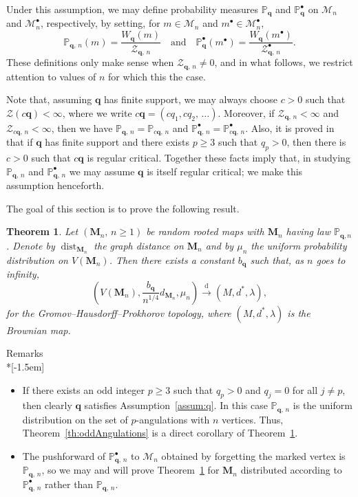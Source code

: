 \documentclass[10pt]{amsart}
\newtheorem{theo}{Theorem}[section]
\theoremstyle{definition}\newtheorem{defi}[theo]{Definition}\newtheorem{rema}[theo]{Remark}\newtheorem{exam}[theo]{Example}\newtheorem{exem}[theo]{Example}\newtheorem{nota}[theo]{Notation}
\newcommand{\bbP}{\mathbb{P}}
\newcommand{\bfq}{\mathbf{q}}
\newcommand{\cM}{\mathcal{M}}
\newcommand{\cZ}{\mathcal{Z}}
\newcommand{\bM}{\mathbf{M}}
\DeclareMathOperator{\dist}{dist}
\newcommand{\sbt}{{\ensuremath{\scriptscriptstyle\bullet}}}
\newcommand{\convdist}{\ensuremath{\stackrel{\mathrm{d}}{\rightarrow}}}
\begin{document}
Under this assumption, we may define probability measures $\bbP_{\bfq}$ and $\bbP^\bullet_{\bfq}$ on $\cM_n$ and $\cM_n^\bullet$, respectively, by setting, for $m\in \cM_n$ and $m^\sbt \in \cM_n^\sbt$,
\[
\bbP_{\bfq,\,n}(m) = \frac{W_{\bfq}(m)}{\cZ_{\bfq,\,n}}\quad \text{and}\quad\bbP^\bullet_{\bfq}(m^\sbt) = \frac{W_{\bfq}(m^\sbt)}{\cZ^\sbt_{\bfq,\,n}}.
\]
These definitions only make sense when $\cZ_{\bfq,\,n}\neq 0$, and in what follows, we restrict attention to values of $n$ for which this the case.


Note that, assuming $\bfq$ has finite support, we may always choose $c > 0$ such that $\cZ(c\bfq)<\infty$, where we write $c\bfq=(cq_1,cq_2,\,\ldots)$. Moreover, if $\cZ_{\bfq,\,n}< \infty$ and $\cZ_{c\bfq,\,n}<\infty$, then we have $\bbP_{\bfq,\,n}=\bbP_{c\bfq,\,n}$ and $\bbP_{\bfq,\,n}^\sbt=\bbP_{c\bfq,\,n}^\sbt$. Also, it is proved in~\cite[the Appendix]{CurienLeGallMiermontCactus} that if $\bfq$ has finite support and there exists $p\geq 3$ such that $q_p>0$, then there is $c>0$ such that $c\bfq$ is regular critical. Together these facts imply that, in studying $\bbP_{\bfq,\,n}$ and $\bbP_{\bfq,\,n}^\sbt$ we may assume $\bfq$ is itself regular critical; we make this assumption henceforth.

The goal of this section is to prove the following result.

\begin{theo}\label{th:convergence}
Let $(\bM_n,\,n \ge 1)$ be random rooted maps with $\bM_n$ having law $\bbP_{\bfq,n}$. Denote by $\dist_{\bM_n}$ the graph distance on $\bM_n$ and by $\mu_n$ the uniform probability distribution on $V(\bM_n)$. Then there exists a constant $b_\bfq$ such that, as $n$ goes to infinity,
\[
\left(V(\bM_n),\frac{b_{\bfq}}{n^{1/4}}d_{\bM_n},\mu_n\right) \convdist (M,d^*,\lambda),
\]
for the Gromov--Hausdorff--Prokhorov topology, where $(M,d^*,\lambda)$ is the Brownian map.
\end{theo}

\begin{enonce*}[plain]{Remarks}\ \\*[-1.5em]
\begin{itemize} 
 \item[$\star$] If there exists an odd integer $p\geq 3$ such that $q_p > 0 $ and $q_j = 0$ for all $j\neq p$, then clearly $\bfq$ satisfies Assumption~\ref{assum:q}. In this case $\bbP_{\bfq,\,n}$ is the uniform distribution on the set of $p$-angulations with $n$ vertices. Thus, Theorem~\ref{th:oddAngulations} is a direct corollary of Theorem~\ref{th:convergence}.
\item[$\star$] The pushforward of $\bbP^\bullet_{\bfq,\,n}$ to $\cM_n$ obtained by forgetting the marked vertex is $\bbP_{\bfq,\,n}$, so we may and will prove Theorem~\ref{th:convergence} for $\bM_n$ distributed according to $\bbP^\bullet_{\bfq,\,n}$ rather than $\bbP_{\bfq,\,n}$.
\end{itemize}
\end{enonce*}
\end{document}
